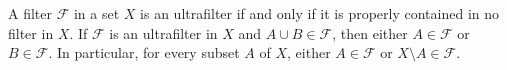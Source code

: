 A filter $\mathcal{F}$ in a set $X$ is an ultrafilter if and only if it is properly contained in no filter in $X$. If $\mathcal{F}$ is an ultrafilter in $X$ and $A \cup B \in \mathcal{F}$, then either $A \in \mathcal{F}$ or $B \in \mathcal{F}$. In particular, for every subset $A$ of $X$, either $A \in \mathcal{F}$ or $X \setminus A \in \mathcal{F}$.
